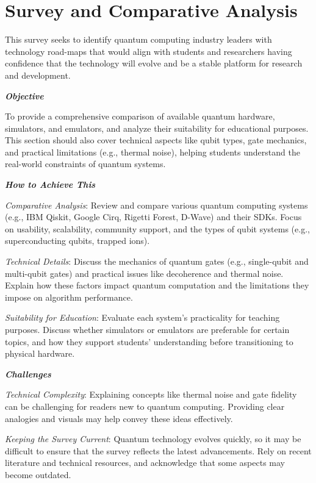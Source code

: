 \section{Survey and Comparative Analysis}


This survey seeks to identify quantum computing industry leaders with technology road-maps that would align with students
and researchers having confidence that the technology will evolve and be a stable platform for research and development.

\textbf{\emph{Objective}}

To provide a comprehensive comparison of available quantum hardware, simulators, and emulators, and analyze their suitability for educational purposes. This section should also cover technical aspects like qubit types, gate mechanics, and practical limitations (e.g., thermal noise), helping students understand the real-world constraints of quantum systems.

\textbf{\emph{How to Achieve This}}

\emph{Comparative Analysis}: Review and compare various quantum computing systems (e.g., IBM Qiskit, Google Cirq, Rigetti Forest, D-Wave) and their SDKs. Focus on usability, scalability, community support, and the types of qubit systems (e.g., superconducting qubits, trapped ions).
      
\emph{Technical Details}: Discuss the mechanics of quantum gates (e.g., single-qubit and multi-qubit gates) and practical issues like decoherence and thermal noise. Explain how these factors impact quantum computation and the limitations they impose on algorithm performance.
    
\emph{Suitability for Education}: Evaluate each system’s practicality for teaching purposes. Discuss whether simulators or emulators are preferable for certain topics, and how they support students’ understanding before transitioning to physical hardware.

\textbf{\emph{Challenges}}

\emph{Technical Complexity}: Explaining concepts like thermal noise and gate fidelity can be challenging for readers new to quantum computing. Providing clear analogies and visuals may help convey these ideas effectively.
    
\emph{Keeping the Survey Current}: Quantum technology evolves quickly, so it may be difficult to ensure that the survey reflects the latest advancements. Rely on recent literature and technical resources, and acknowledge that some aspects may become outdated.
    
